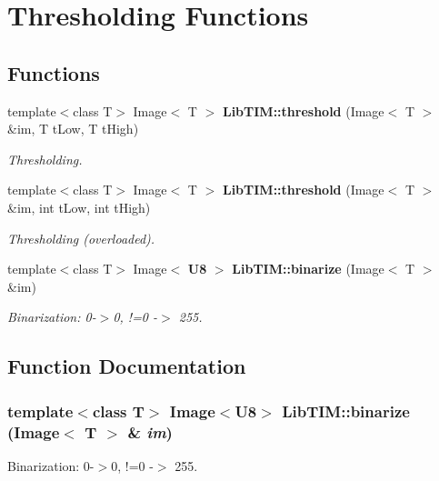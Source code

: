 \section{Thresholding Functions}
\label{group__thresholding}
\subsection*{Functions}
\begin{CompactItemize}
\item 
template$<$class T$>$ Image$<$ T $>$ {\bf Lib\-TIM::threshold} (Image$<$ T $>$ \&im, T t\-Low, T t\-High)
\begin{CompactList}\small\item\em Thresholding. \item\end{CompactList}\item 
template$<$class T$>$ Image$<$ T $>$ {\bf Lib\-TIM::threshold} (Image$<$ T $>$ \&im, int t\-Low, int t\-High)
\begin{CompactList}\small\item\em Thresholding (overloaded). \item\end{CompactList}\item 
template$<$class T$>$ Image$<$ {\bf U8} $>$ {\bf Lib\-TIM::binarize} (Image$<$ T $>$ \&im)
\begin{CompactList}\small\item\em Binarization: 0-$>$0, !=0 -$>$ 255. \item\end{CompactList}\end{CompactItemize}


\subsection{Function Documentation}
\subsubsection{\setlength{\rightskip}{0pt plus 5cm}template$<$class T$>$ Image$<${\bf U8}$>$ Lib\-TIM::binarize (Image$<$ T $>$ \& {\em im})}\label{group__thresholding_ga2}


Binarization: 0-$>$0, !=0 -$>$ 255. 

